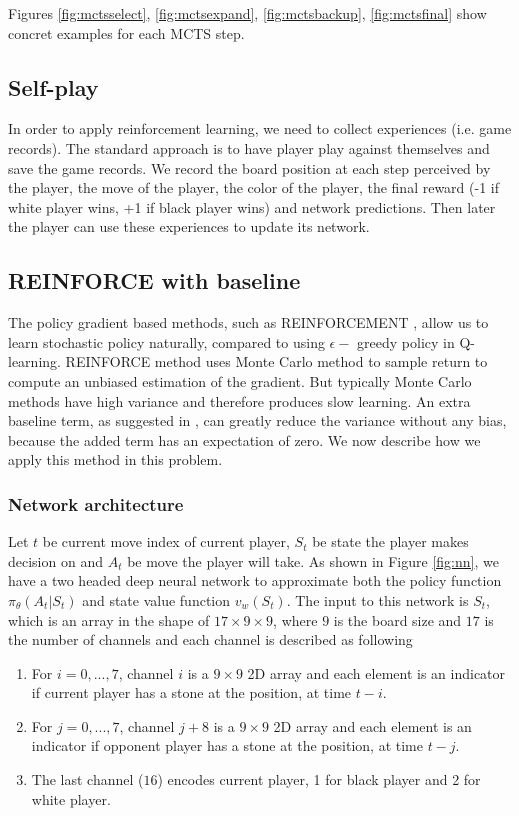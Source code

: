 \documentclass{article}
\begin{document}
Figures \ref{fig:mctsselect}, \ref{fig:mctsexpand}, \ref{fig:mctsbackup}, \ref{fig:mctsfinal} show concret examples for each MCTS step.

\subsection{Self-play}
In order to apply reinforcement learning, we need to collect experiences (i.e. game records). The standard approach is to have player play against themselves and save the game records. We record the board position at each step perceived by the player, the move of the player, the color of the player, the final reward (-1 if white player wins, +1 if black player wins) and network predictions. Then later the player can use these experiences to update its network.

\subsection{REINFORCE with baseline}
The policy gradient based methods, such as REINFORCEMENT \cite{williams1987reinforcement}, allow us to learn stochastic policy naturally, compared to using $\epsilon-$ greedy policy in Q-learning. REINFORCE method uses Monte Carlo method to sample return to compute an unbiased estimation of the gradient. But typically Monte Carlo methods have high variance and therefore produces slow learning. An extra baseline term, as suggested in \cite{sutton2018reinforcement}, can greatly reduce the variance without any bias, because the added term has an expectation of zero. We now describe how we apply this method in this problem.


\subsubsection{Network architecture}
\label{sec:nn}
Let $t$ be current move index of current player, $S_t$ be state the player makes decision on and $A_t$ be move the player will take. As shown in Figure \ref{fig:nn}, we have a two headed deep neural network to approximate both the policy function $\pi_{\theta}(A_t|S_t)$ and state value function $v_w(S_t)$.  The input to this network is $S_t$, which is an array in the shape of $17 \times 9 \times 9$, where $9$ is the board size and $17$ is the number of channels and each channel is described as following 

\begin{enumerate}
  \item
    For $i = 0, ..., 7$, channel $i$ is a $9 \times 9$ 2D array and each element is an indicator if current player has a stone at the position, at time $t-i$.
  \item
    For $j = 0, ..., 7$, channel $j+8$ is a $9 \times 9$ 2D array and each element is an indicator if opponent player has a stone at the position, at time $t-j$.
  \item
    The last channel ($16$) encodes current player, 1 for black player and 2 for white player.
\end{enumerate}
\end{document}
